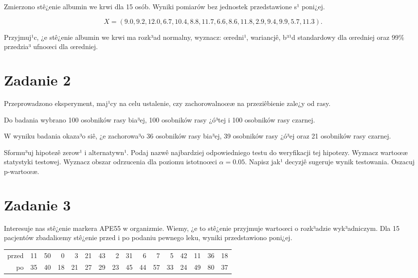 \documentclass[a4paper,12pt]{article}
\begin{document}
     Zmierzono stê¿enie albumin we krwi dla 15 osób. 
     Wyniki pomiarów bez jednostek przedstawione s¹ poni¿ej. 
     
     \noindent $$X=(  9.0,  9.2, 12.0,  6.7, 10.4,  8.8, 11.7,  6.6,  8.6, 11.8,  2.9,  9.4,  9.9,  5.7, 11.3 ).$$
     
     Przyjmuj¹c, ¿e stê¿enie albumin we krwi ma rozk³ad normalny, 
     wyznacz: œredni¹, wariancjê, b³¹d standardowy dla œredniej oraz 99\% przedzia³ ufnoœci dla œredniej. \vspace{1cm} 

  \section*{Zadanie 2}
     
  Przeprowadzono eksperyment, maj¹cy na celu ustalenie, czy zachorowalnoœæ na przeziêbienie zale¿y od rasy.
  
  Do badania wybrano 100 osobników rasy bia³ej, 100 osobników rasy ¿ó³tej i 100 osobników rasy czarnej. 
  
  W wyniku badania okaza³o siê, ¿e zachorowa³o 36 osobników rasy bia³ej, 39 osobników rasy ¿ó³ej oraz 21 osobników rasy czarnej. 
  
  Sformu³uj hipotezê zerow¹ i alternatywn¹. 
  Podaj nazwê najbardziej odpowiedniego testu do weryfikacji tej hipotezy. 
  Wyznacz wartoœæ statystyki testowej. 
  Wyznacz obszar odrzucenia dla poziomu istotnoœci $\alpha=0.05$. 
  Napisz jak¹ decyzjê sugeruje wynik testowania. Oszacuj p-wartoœæ. \vspace{1cm} 

  \section*{Zadanie 3}
     
  Interesuje nas stê¿enie markera APE55  w organizmie. 
  Wiemy, ¿e to stê¿enie przyjmuje wartoœci o rozk³adzie wyk³adniczym. 
  Dla 15 pacjentów zbadaliœmy stê¿enie przed i po podaniu pewnego leku, 
  wyniki przedstawiono poni¿ej.
  
  \vspace{0.5cm} 
  \noindent\begin{center} 
\begin{tabular}{rrrrrrrrrrrrrrrr}
  \hline
  \hline
przed & 11 & 50 & 0 & 3 & 21 & 43 & 2 & 31 & 6 & 7 & 5 & 42 & 11 & 36 & 18 \\
  po & 35 & 40 & 18 & 21 & 27 & 29 & 23 & 45 & 44 & 57 & 33 & 24 & 49 & 80 & 37 \\
   \hline
\end{tabular}
 
  \end{center} 
  \vspace{0.5cm}
  
\end{document}
